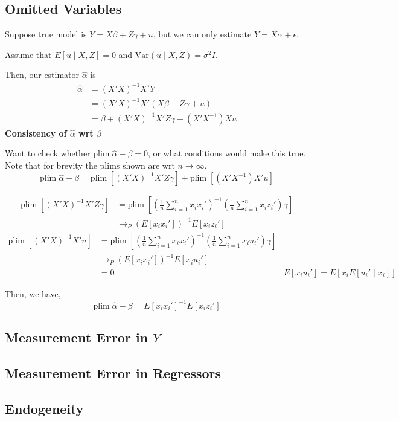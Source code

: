 \documentclass[16pt]{article}
\newcommand{\ah}{\hat{\alpha}}
\newcommand{\plim}{\text{plim}\; }
\newcommand{\Var}{\text{Var}}
\begin{document}
\subsection*{Omitted Variables}

Suppose true model is $Y = X\beta + Z\gamma + u$, but we can only estimate $Y = X\alpha + \epsilon$.

Assume that $E[u \mid X, Z] = 0$ and $\Var(u\mid X, Z) = \sigma^2 I$.

Then, our estimator $\ah$ is
\begin{align*}
  \ah &= (X'X)^{-1}X'Y\\
      &= (X'X)^{-1}X'(X\beta + Z\gamma + u)\\
      &= \beta + (X'X)^{-1}X'Z\gamma + (X'X^{-1})Xu
\end{align*}
\textbf{Consistency of $\ah$ wrt $\beta$}

Want to check whether $\plim \ah - \beta = 0$, or what conditions would make this true. Note that for brevity the plims shown are wrt $n \to \infty$.
$$\plim \ah - \beta = \plim [(X'X)^{-1}X' Z \gamma] + \plim [(X'X^{-1})X'u]$$

\begin{align*}
    \plim [(X'X)^{-1}X' Z \gamma] &= \plim [(\frac{1}{n} \sum_{i=1}^n x_i x_i')^{-1} (\frac{1}{n} \sum_{i=1}^n x_i z_i') \gamma]\\
    &\to_P (E[x_i x_i'])^{-1} E[x_i z_i']
\end{align*}
\begin{align*}
  \plim [(X'X)^{-1} X' u] &= \plim [(\frac{1}{n} \sum_{i=1}^n x_i x_i')^{-1} (\frac{1}{n} \sum_{i=1}^n x_i u_i') \gamma]\\
    &\to_P (E[x_i x_i'])^{-1} E[x_i u_i']\\
    &= 0 & E[x_i u_i'] = E[x_i E[u_i'\mid x_i]]
\end{align*}

Then, we have, $$\plim \ah - \beta = E[x_i x_i']^{-1} E[x_i z_i']$$

\subsection*{Measurement Error in $Y$}

\subsection*{Measurement Error in Regressors}

\subsection*{Endogeneity}
\end{document}
